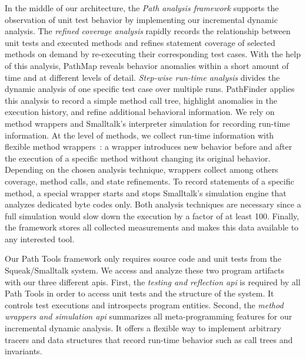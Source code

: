 \documentclass[preprint,3p]{elsarticle}
\newcommand{\ac}[1]{\gls{#1}}
\begin{document}
In the middle of our architecture, the \emph{Path analysis framework} supports
the observation of unit test behavior by implementing our incremental dynamic
analysis.  The \emph{refined coverage analysis} rapidly records the relationship
between unit tests and executed methods and refines statement coverage of
selected methods on demand by re-executing their corresponding test cases.  With
the help of this analysis, PathMap reveals behavior anomalies within a short
amount of time and at different levels of detail.  \emph{Step-wise run-time
  analysis} divides the dynamic analysis of one specific test case over multiple
runs.  PathFinder applies this analysis to record a simple method call tree,
highlight anomalies in the execution history, and refine additional behavioral
information. We rely on method wrappers and Smalltalk’s interpreter simulation
for recording run-time information.  At the level of methods, we collect
run-time information with flexible method wrappers~\cite{Brant1998wtr}: a
wrapper introduces new behavior before and after the execution of a specific
method without changing its original behavior.  Depending on the chosen analysis
technique, wrappers collect among others coverage, method calls, and state
refinements.  To record statements of a specific method, a special wrapper
starts and stops Smalltalk’s simulation engine that analyzes dedicated byte
codes only.  Both analysis techniques are necessary since a full simulation
would slow down the execution by a factor of at least 100.  Finally, the
framework stores all collected measurements and makes this data available to any
interested tool.


Our Path Tools framework only requires source code and unit tests from the Squeak/Smalltalk system. 
We access and analyze these two program artifacts with our three different \ac{api}s. 
First, the \emph{testing and reflection \ac{api}} is required by all Path Tools in order to access unit tests and the structure of the system. 
It controls test executions and introspects program entities.
Second, the \emph{method wrappers and simulation \ac{api}} summarizes all meta-programming features for our incremental dynamic analysis. 
It offers a flexible way to implement arbitrary tracers and data structures that record run-time behavior such as call trees and invariants. 

\end{document}
